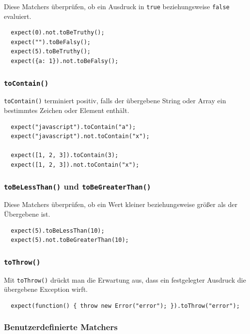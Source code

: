 \documentclass[11pt, a4paper]{article}
\begin{document}
Diese Matchers überprüfen, ob ein Ausdruck in \texttt{true} beziehungsweise
\texttt{false} evaluiert.

\begin{verbatim}
  expect(0).not.toBeTruthy();
  expect("").toBeFalsy();
  expect(5).toBeTruthy();
  expect({a: 1}).not.toBeFalsy();
\end{verbatim}

\subsubsection*{\texttt{toContain()}}

\texttt{toContain()} terminiert positiv, falls der übergebene String oder Array
ein bestimmtes Zeichen oder Element enthält.

\begin{verbatim}
  expect("javascript").toContain("a");
  expect("javascript").not.toContain("x");

  expect([1, 2, 3]).toContain(3);
  expect([1, 2, 3]).not.toContain("x");
\end{verbatim}

\subsubsection*{\texttt{toBeLessThan()} und \texttt{toBeGreaterThan()}}

Diese Matchers überprüfen, ob ein Wert kleiner beziehungsweise größer als der
Übergebene ist.

\begin{verbatim}
  expect(5).toBeLessThan(10);
  expect(5).not.toBeGreaterThan(10);
\end{verbatim}

\subsubsection*{\texttt{toThrow()}}

Mit \texttt{toThrow()} drückt man die Erwartung aus, dass ein festgelegter
Ausdruck die übergebene Exception wirft.

\begin{verbatim}
  expect(function() { throw new Error("error"); }).toThrow("error");
\end{verbatim}

\subsubsection*{Benutzerdefinierte Matchers}
\end{document}
